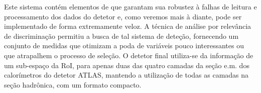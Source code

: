 Este sistema contém elementos de que garantam sua robustez à falhas de leitura
e processamento dos dados do detetor e, como veremos mais à diante, pode ser
implementado de forma extremamente veloz. A técnica de análise por relevância
de discriminação permitiu a busca de tal sistema de deteção, fornecendo um
conjunto de medidas que otimizam a poda de variáveis pouco interessantes ou
que atrapalhem o processo de seleção. O detetor final utiliza-se da informação
de um sub-espaço da RoI, para apenas duas das quatro camadas da seção e.m. dos
calorímetros do detetor ATLAS, mantendo a utilização de todas as camadas na
seção hadrônica, com um formato compacto.

